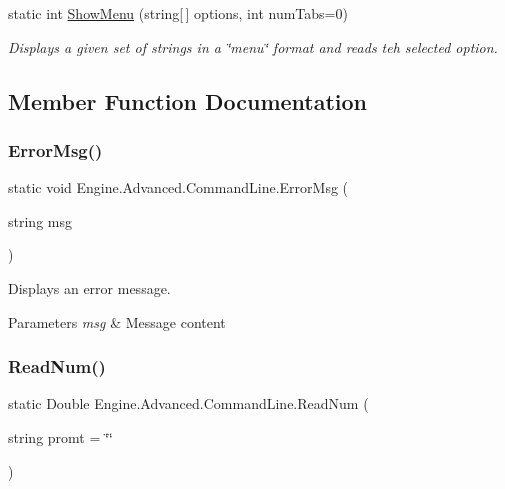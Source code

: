 \begin{DoxyCompactItemize}
static int \mbox{\hyperlink{class_engine_1_1_advanced_1_1_command_line_a1cb5e1866e37ec8a7b7db7a6d6e7766e}{Show\+Menu}} (string\mbox{[}$\,$\mbox{]} options, int num\+Tabs=0)
\begin{DoxyCompactList}\small\item\em Displays a given set of strings in a \char`\"{}menu\char`\"{} format and reads teh selected option. \end{DoxyCompactList}\end{DoxyCompactItemize}


\subsection{Member Function Documentation}
\mbox{\label{class_engine_1_1_advanced_1_1_command_line_a926a8ff590e7579867a97b022cea3bc8}} 
\subsubsection{\texorpdfstring{ErrorMsg()}{ErrorMsg()}}
{\footnotesize\ttfamily static void Engine.\+Advanced.\+Command\+Line.\+Error\+Msg (\begin{DoxyParamCaption}\item[{string}]{msg }\end{DoxyParamCaption})\hspace{0.3cm}{\ttfamily [static]}}



Displays an error message. 


\begin{DoxyParams}{Parameters}
{\em msg} & Message content\\
\hline
\end{DoxyParams}
\mbox{\label{class_engine_1_1_advanced_1_1_command_line_a292a829c58f3099aee3a86aaa9e22ecf}} 
\subsubsection{\texorpdfstring{ReadNum()}{ReadNum()}}
{\footnotesize\ttfamily static Double Engine.\+Advanced.\+Command\+Line.\+Read\+Num (\begin{DoxyParamCaption}\item[{string}]{promt = {\ttfamily \char`\"{}\char`\"{}} }\end{DoxyParamCaption})\hspace{0.3cm}{\ttfamily [static]}}



